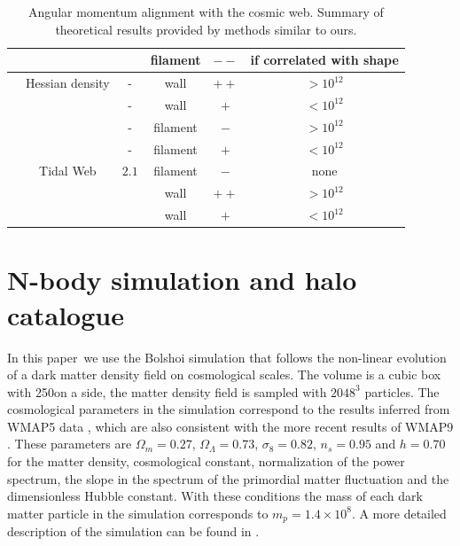 \documentclass[useAMS,usenatbib]{mn2e}
\newcommand{\documentname}{paper~}
\newcommand{\hMpc}{{\ifmmode{h^{-1}{\rm Mpc}}\else{$h^{-1}$Mpc }\fi}}
\newcommand{\hMsun}{{\ifmmode{h^{-1}{\rm
        {M_{\odot}}}}\else{$h^{-1}{\rm{M_{\odot}}}$~}\fi}}
\begin{document}
\begin{table}
\begin{tabular}{cccccc}
& &  &
filament & $--$ & if correlated with shape\\\hline

\cite{AragonCalvo2007} & Hessian density & - &
wall & $++$ & $>10^{12}$\hMsun\\


& & - &
wall & $+$ & $<10^{12}$\hMsun\\

& & - &
filament& $-$ & $>10^{12}$\hMsun\\


& & - &
filament& $+$ & $<10^{12}$\hMsun\\\hline



\cite{Hahn2007} & Tidal Web & $2.1$ & filament & $-$& none\\

& & &
wall & $++$ & $>10^{12}$\hMsun\\
& &    &
wall& $+$ & $<10^{12}$\hMsun\\\hline \hline


\end{tabular}
\caption{Angular momentum alignment with the cosmic web. Summary of theoretical
  results provided by methods similar to ours.}

\end{table}



\section{N-body simulation and halo catalogue}
\label{sec:nbody}

In this \documentname we use the Bolshoi simulation that follows the
non-linear evolution of a dark matter density field on cosmological
scales. The volume is a cubic box with 250\hMpc on a side, the matter
density field is sampled with $2048^3$ particles. The 
cosmological parameters in the simulation correspond to the results
inferred from WMAP5 data \citep{2009ApJS..180..306D}, which are also consistent with the more
recent results of WMAP9 \citep{2013ApJS..208...19H}. These parameters are $\Omega_m=0.27$,
$\Omega_{\Lambda} =0.73$, $\sigma_8=0.82$, $n_s=0.95$ and $h=0.70$ for the
matter density, cosmological constant, normalization of the power
spectrum, the slope in the spectrum of the primordial matter
fluctuation and the dimensionless Hubble constant. With these
conditions the mass of each dark matter particle in the simulation
corresponds to $m_p=1.4\times 10^{8}$\hMsun. A more detailed
description of the simulation can be found in
\citep{2011ApJ...740..102K}.
\end{document}
